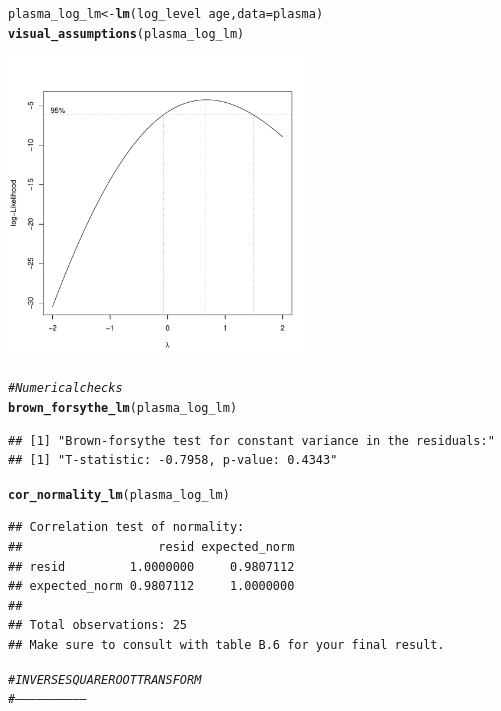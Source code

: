 \documentclass{article}\usepackage[]{graphicx}\usepackage[]{color}
\makeatletter
\newcommand{\hlcom}[1]{\textcolor[rgb]{0.678,0.584,0.686}{\textit{#1}}}%
\newcommand{\hlopt}[1]{\textcolor[rgb]{0,0,0}{#1}}%
\newcommand{\hlstd}[1]{\textcolor[rgb]{0.345,0.345,0.345}{#1}}%
\newcommand{\hlkwb}[1]{\textcolor[rgb]{0.69,0.353,0.396}{#1}}%
\newcommand{\hlkwc}[1]{\textcolor[rgb]{0.333,0.667,0.333}{#1}}%
\newcommand{\hlkwd}[1]{\textcolor[rgb]{0.737,0.353,0.396}{\textbf{#1}}}%
\newenvironment{kframe}{%
 \def\at@end@of@kframe{}%
 \ifinner\ifhmode%
  \def\at@end@of@kframe{\end{minipage}}%
  \begin{minipage}{\columnwidth}%
 \fi\fi%
 \def\FrameCommand##1{\hskip\@totalleftmargin \hskip-\fboxsep
 \colorbox{shadecolor}{##1}\hskip-\fboxsep
     \hskip-\linewidth \hskip-\@totalleftmargin \hskip\columnwidth}%
 \MakeFramed {\advance\hsize-\width
   \@totalleftmargin\z@ \linewidth\hsize
   \@setminipage}}%
 {\par\unskip\endMakeFramed%
 \at@end@of@kframe}
\newenvironment{knitrout}{}{} %
\makeatother
\begin{document}
\begin{knitrout}
\begin{kframe}
\begin{alltt}
\hlstd{plasma_log_lm} \hlkwb{<-} \hlkwd{lm}\hlstd{(log_level} \hlopt{~} \hlstd{age,} \hlkwc{data} \hlstd{= plasma)}
\hlkwd{visual_assumptions}\hlstd{(plasma_log_lm)}
\end{alltt}
\end{kframe}
\includegraphics[width=0.6\textwidth]{figure/unnamed-chunk-1-3} 
\begin{kframe}\begin{alltt}
\hlcom{# Numerical checks}
\hlkwd{brown_forsythe_lm}\hlstd{(plasma_log_lm)}
\end{alltt}
\begin{verbatim}
## [1] "Brown-forsythe test for constant variance in the residuals:"
## [1] "T-statistic: -0.7958, p-value: 0.4343"
\end{verbatim}
\begin{alltt}
\hlkwd{cor_normality_lm}\hlstd{(plasma_log_lm)}
\end{alltt}
\begin{verbatim}
## Correlation test of normality:
##                   resid expected_norm
## resid         1.0000000     0.9807112
## expected_norm 0.9807112     1.0000000
## 
## Total observations: 25
## Make sure to consult with table B.6 for your final result.
\end{verbatim}
\begin{alltt}
\hlcom{# INVERSE SQUARE ROOT TRANSFORM}
\hlcom{# ------------------------------}


\end{alltt}
\end{kframe}
\end{knitrout}
\end{document}
